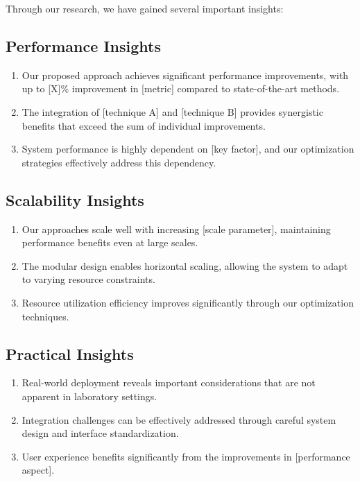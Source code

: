 Through our research, we have gained several important insights:

\subsection{Performance Insights}

\begin{enumerate}
    \item Our proposed approach achieves significant performance improvements, with up to [X]\% improvement in [metric] compared to state-of-the-art methods.
    
    \item The integration of [technique A] and [technique B] provides synergistic benefits that exceed the sum of individual improvements.
    
    \item System performance is highly dependent on [key factor], and our optimization strategies effectively address this dependency.
\end{enumerate}

\subsection{Scalability Insights}

\begin{enumerate}
    \item Our approaches scale well with increasing [scale parameter], maintaining performance benefits even at large scales.
    
    \item The modular design enables horizontal scaling, allowing the system to adapt to varying resource constraints.
    
    \item Resource utilization efficiency improves significantly through our optimization techniques.
\end{enumerate}

\subsection{Practical Insights}

\begin{enumerate}
    \item Real-world deployment reveals important considerations that are not apparent in laboratory settings.
    
    \item Integration challenges can be effectively addressed through careful system design and interface standardization.
    
    \item User experience benefits significantly from the improvements in [performance aspect].
\end{enumerate}

